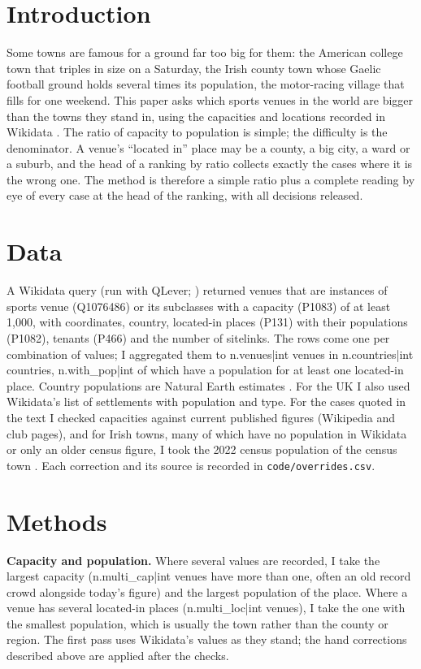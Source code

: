 \documentclass[11pt,a4paper]{article}
\begin{document}
\section{Introduction}
Some towns are famous for a ground far too big for them: the American college town that triples in size on a Saturday, the Irish county town whose Gaelic football ground holds several times its population, the motor-racing village that fills for one weekend. This paper asks which sports venues in the world are bigger than the towns they stand in, using the capacities and locations recorded in Wikidata \citep{vrandecic2014}. The ratio of capacity to population is simple; the difficulty is the denominator. A venue's ``located in'' place may be a county, a big city, a ward or a suburb, and the head of a ranking by ratio collects exactly the cases where it is the wrong one. The method is therefore a simple ratio plus a complete reading by eye of every case at the head of the ranking, with all decisions released.

\section{Data}
A Wikidata query (run with QLever; \citealt{bast2017}) returned venues that are instances of sports venue (Q1076486) or its subclasses with a capacity (P1083) of at least 1,000, with coordinates, country, located-in places (P131) with their populations (P1082), tenants (P466) and the number of sitelinks. The rows come one per combination of values; I aggregated them to {{n.venues|int}} venues in {{n.countries|int}} countries, {{n.with_pop|int}} of which have a population for at least one located-in place. Country populations are Natural Earth estimates \citep{naturalearth}. For the UK I also used Wikidata's list of settlements with population and type. For the cases quoted in the text I checked capacities against current published figures (Wikipedia and club pages), and for Irish towns, many of which have no population in Wikidata or only an older census figure, I took the 2022 census population of the census town \citep{cso2022}. Each correction and its source is recorded in \texttt{code/overrides.csv}.

\section{Methods}
\textbf{Capacity and population.} Where several values are recorded, I take the largest capacity ({{n.multi_cap|int}} venues have more than one, often an old record crowd alongside today's figure) and the largest population of the place. Where a venue has several located-in places ({{n.multi_loc|int}} venues), I take the one with the smallest population, which is usually the town rather than the county or region. The first pass uses Wikidata's values as they stand; the hand corrections described above are applied after the checks.
\end{document}
